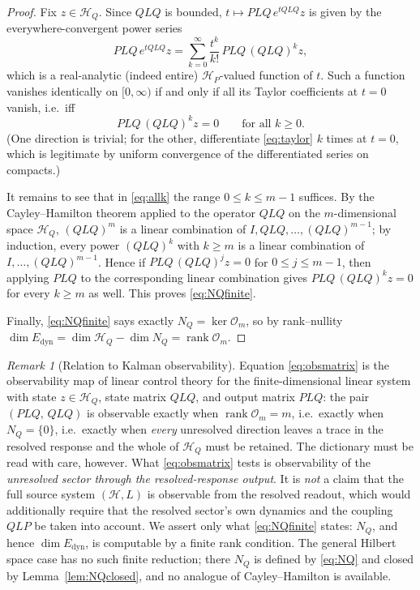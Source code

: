 \documentclass[11pt,reqno]{amsart}
\numberwithin{equation}{section}
\theoremstyle{plain}
\theoremstyle{definition}
\theoremstyle{remark}
\newtheorem{remark}[theorem]{Remark}
\newcommand{\HP}{\mathcal{H}_{P}}
\newcommand{\HQ}{\mathcal{H}_{Q}}
\newcommand{\Edyn}{E_{\mathrm{dyn}}}
\DeclareMathOperator{\Rank}{rank}
\begin{document}
\begin{proof}
Fix $z\in\HQ$. Since $QLQ$ is bounded, $t\mapsto PLQ\,e^{tQLQ}z$ is given by the
everywhere-convergent power series
\begin{equation}
\label{eq:taylor}
PLQ\,e^{tQLQ}z=\sum_{k=0}^{\infty}\frac{t^{k}}{k!}\,PLQ\,(QLQ)^{k}z ,
\end{equation}
which is a real-analytic (indeed entire) $\HP$-valued function of $t$. Such a function
vanishes identically on $[0,\infty)$ if and only if all its Taylor coefficients at $t=0$
vanish, i.e.\ iff
\begin{equation}
\label{eq:allk}
PLQ\,(QLQ)^{k}z=0
\qquad\text{for all }k\ge0 .
\end{equation}
(One direction is trivial; for the other, differentiate \eqref{eq:taylor} $k$ times at $t=0$,
which is legitimate by uniform convergence of the differentiated series on compacts.)

It remains to see that in \eqref{eq:allk} the range $0\le k\le m-1$ suffices. By the
Cayley--Hamilton theorem applied to the operator $QLQ$ on the $m$-dimensional space $\HQ$,
$(QLQ)^{m}$ is a linear combination of $I,QLQ,\dots,(QLQ)^{m-1}$; by induction, every power
$(QLQ)^{k}$ with $k\ge m$ is a linear combination of $I,\dots,(QLQ)^{m-1}$. Hence if
$PLQ\,(QLQ)^{j}z=0$ for $0\le j\le m-1$, then applying $PLQ$ to the corresponding linear
combination gives $PLQ\,(QLQ)^{k}z=0$ for every $k\ge m$ as well. This proves
\eqref{eq:NQfinite}.

Finally, \eqref{eq:NQfinite} says exactly $N_{Q}=\ker\mathcal{O}_{m}$, so by rank--nullity
$\dim\Edyn=\dim\HQ-\dim N_{Q}=\Rank\mathcal{O}_{m}$.
\end{proof}

\begin{remark}[Relation to Kalman observability]
\label{rem:kalman}
Equation \eqref{eq:obsmatrix} is the observability map of linear control theory
\cite{Kalman1960,Sontag} for the finite-dimensional linear system with state $z\in\HQ$,
state matrix $QLQ$, and output matrix $PLQ$: the pair $(PLQ,\,QLQ)$ is observable exactly when
$\Rank\mathcal{O}_{m}=m$, i.e.\ exactly when $N_{Q}=\{0\}$, i.e.\ exactly when \emph{every}
unresolved direction leaves a trace in the resolved response and the whole of $\HQ$ must be
retained. The dictionary must be read with care, however. What \eqref{eq:obsmatrix} tests is
observability of the \emph{unresolved sector through the resolved-response output}. It is
\emph{not} a claim that the full source system $(\mathcal{H},L)$ is observable from the
resolved readout, which would additionally require that the resolved sector's own dynamics
and the coupling $QLP$ be taken into account. We assert only what \eqref{eq:NQfinite} states:
$N_{Q}$, and hence $\dim\Edyn$, is computable by a finite rank condition. The general Hilbert
space case has no such finite reduction; there $N_{Q}$ is defined by \eqref{eq:NQ} and closed
by Lemma~\ref{lem:NQclosed}, and no analogue of Cayley--Hamilton is available.
\end{remark}
\end{document}
